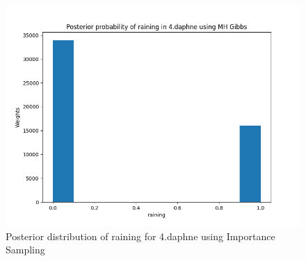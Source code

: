 \documentclass{article}
\begin{document}
\begin{enumerate}
\begin{enumerate}
\begin{figure}[!ht]
	\centering
	\includegraphics[scale=0.6]{../figs/Gibbs/posterior_histogram_4_daphne}
	\caption{Posterior distribution of raining for 4.daphne using Importance Sampling}
\end{figure}


\end{enumerate}
\end{enumerate}
\end{document}
